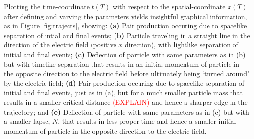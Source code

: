\documentclass[12pt]{revtex4}
\newcommand{\red}{\textcolor{red}}
\begin{document}
Plotting the time-coordinate $t(T)$ with respect to the spatial-coordinate $x(T)$ after defining and varying the parameters yields insightful graphical information, as in Figure \ref{fig:trajects}, showing: \textbf{(a)} Pair production occuring due to spacelike separation of intial and final events; \textbf{(b)} Particle traveling in a straight line in the direction of the electric field (positive $x$ direction), with lightlike separation of initial and final events; \textbf{(c)} Deflection of particle with same parameters as in (b) but with timelike separation that results in an initial momentum of particle in the opposite direction to the electric field before ultimately being `turned around' by the electric field; \textbf{(d)} Pair production occuring due to spacelike separation of initial and final events, just as in (a), but for a much smaller particle mass that results in a smaller critical distance \red{(EXPLAIN)} and hence a sharper edge in the trajectory; and \textbf{(e)} Deflection of particle with same parameters as in (c) but with a smaller lapse, $N$, that results in less proper time and hence a smaller initial momentum of particle in the opposite direction to the electric field.
\end{document}
